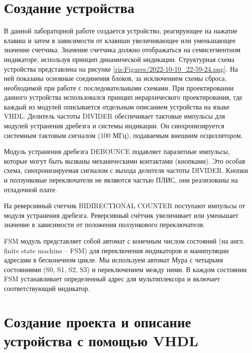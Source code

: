 \begin{sloppypar} %
\newpage %

\section{Создание устройства} %
В данной лабораторной работе создается устройство, реагирующее на нажатие клавиш и затем в зависимости от клавиши увеличивающее или
уменьшающее значение счетчика. Значение счетчика должно отображаться на семисегментном индикаторе, используя принцип динамической индикации. Структурная схема устройства представлена на рисунке \ref{ris:Figures/2022-10-10_22-59-24.png}. На ней показаны основные соединения блоков, за исключением схемы сброса, необходимой при работе с последовательными схемами.
При проектировании данного устройства использовался принцип иерархического проектирования, где каждый из модулей описывается отдельным описанием устройства на языке VHDL. 
Делитель частоты DIVIDER обеспечивает тактовые импульсы для модулей устранения дребезга и системы индикации. Он синхронизируется системным тактовым сигналом (100 МГц), подаваемым внешним осциллятором.


Модуль устранения дребезга DEBOUNCE подавляет паразитные импульсы, которые могут быть вызваны механическими контактами (кнопками). Это особая схема, синхронизируемая сигналом с выхода делителя частоты DIVIDER. Кнопки и ползунковые переключатели не являются частью ПЛИС, они реализованы на отладочной плате.  


На реверсивный счетчик BIDIRECTIONAL COUNTER поступают импульсы от модуля устранения дребезга. Реверсивный счётчик увеличивает или уменьшает значение в зависимости от положения ползункового переключателя.

FSM модуль представляет собой автомат с конечным числом состояний (на англ. finite state machine – FSM) для переключения индикаторов и манипуляции адресами в бесконечном цикле. Мы используем автомат Мура с четырьмя состояниями (S0, S1, S2, S3) и переключением между ними. В каждом состоянии FSM устанавливает определенный адрес для мультиплексора и включает соответствующий индикатор. 








\section{Создание проекта и описание устройства с помощью VHDL} %


\end{sloppypar}

